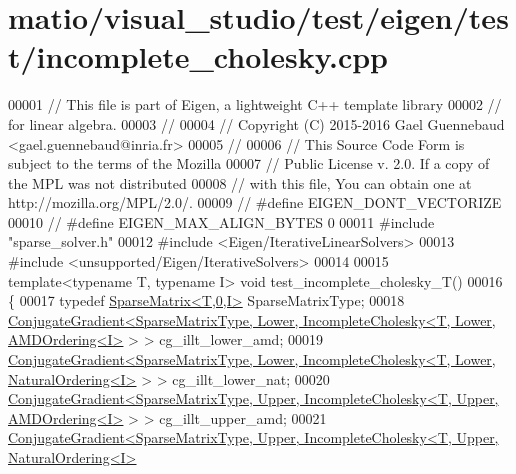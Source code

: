 \hypertarget{matio_2visual__studio_2test_2eigen_2test_2incomplete__cholesky_8cpp_source}{}\section{matio/visual\+\_\+studio/test/eigen/test/incomplete\+\_\+cholesky.cpp}
\label{matio_2visual__studio_2test_2eigen_2test_2incomplete__cholesky_8cpp_source}

\begin{DoxyCode}
00001 \textcolor{comment}{// This file is part of Eigen, a lightweight C++ template library}
00002 \textcolor{comment}{// for linear algebra.}
00003 \textcolor{comment}{//}
00004 \textcolor{comment}{// Copyright (C) 2015-2016 Gael Guennebaud <gael.guennebaud@inria.fr>}
00005 \textcolor{comment}{//}
00006 \textcolor{comment}{// This Source Code Form is subject to the terms of the Mozilla}
00007 \textcolor{comment}{// Public License v. 2.0. If a copy of the MPL was not distributed}
00008 \textcolor{comment}{// with this file, You can obtain one at http://mozilla.org/MPL/2.0/.}
00009 \textcolor{comment}{// #define EIGEN\_DONT\_VECTORIZE}
00010 \textcolor{comment}{// #define EIGEN\_MAX\_ALIGN\_BYTES 0}
00011 \textcolor{preprocessor}{#include "sparse\_solver.h"}
00012 \textcolor{preprocessor}{#include <Eigen/IterativeLinearSolvers>}
00013 \textcolor{preprocessor}{#include <unsupported/Eigen/IterativeSolvers>}
00014 
00015 \textcolor{keyword}{template}<\textcolor{keyword}{typename} T, \textcolor{keyword}{typename} I> \textcolor{keywordtype}{void} test\_incomplete\_cholesky\_T()
00016 \{
00017   \textcolor{keyword}{typedef} \hyperlink{group___sparse_core___module_class_eigen_1_1_sparse_matrix}{SparseMatrix<T,0,I>} SparseMatrixType;
00018   
      \hyperlink{group___iterative_linear_solvers___module_class_eigen_1_1_conjugate_gradient}{ConjugateGradient<SparseMatrixType, Lower, IncompleteCholesky<T, Lower, AMDOrdering<I>}
       > >        cg\_illt\_lower\_amd;
00019   
      \hyperlink{group___iterative_linear_solvers___module_class_eigen_1_1_conjugate_gradient}{ConjugateGradient<SparseMatrixType, Lower, IncompleteCholesky<T, Lower, NaturalOrdering<I>}
       > >    cg\_illt\_lower\_nat;
00020   
      \hyperlink{group___iterative_linear_solvers___module_class_eigen_1_1_conjugate_gradient}{ConjugateGradient<SparseMatrixType, Upper, IncompleteCholesky<T, Upper, AMDOrdering<I>}
       > >        cg\_illt\_upper\_amd;
00021   
      \hyperlink{group___iterative_linear_solvers___module_class_eigen_1_1_conjugate_gradient}{ConjugateGradient<SparseMatrixType, Upper, IncompleteCholesky<T, Upper, NaturalOrdering<I>}

\end{DoxyCode}
